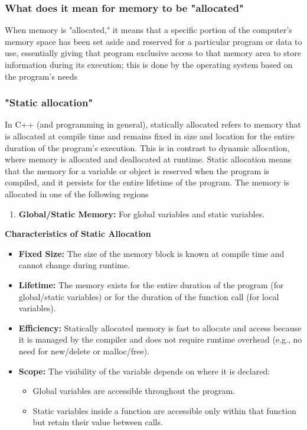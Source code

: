 \documentclass{report}
\begin{document}
 \bigbreak \noindent 
 \subsubsection{What does it mean for memory to be "allocated"}
 \bigbreak \noindent 
 When memory is "allocated," it means that a specific portion of the computer's memory space has been set aside and reserved for a particular program or data to use, essentially giving that program exclusive access to that memory area to store information during its execution; this is done by the operating system based on the program's needs

 \bigbreak \noindent 
 \subsubsection{"Static allocation"}
 \bigbreak \noindent 
 In C++ (and programming in general), statically allocated refers to memory that is allocated at compile time and remains fixed in size and location for the entire duration of the program's execution. This is in contrast to dynamic allocation, where memory is allocated and deallocated at runtime.
 \bigbreak \noindent 
 Static allocation means that the memory for a variable or object is reserved when the program is compiled, and it persists for the entire lifetime of the program.
 \bigbreak \noindent 
 The memory is allocated in one of the following regions
 \begin{enumerate}
     \item \textbf{Global/Static Memory:} For global variables and static variables.
 \end{enumerate}
 \bigbreak \noindent 
 \textbf{Characteristics of Static Allocation}
 \bigbreak \noindent 
 \begin{itemize}
     \item \textbf{Fixed Size:} The size of the memory block is known at compile time and cannot change during runtime.
     \item \textbf{Lifetime:} The memory exists for the entire duration of the program (for global/static variables) or for the duration of the function call (for local variables).
     \item \textbf{Efficiency:} Statically allocated memory is fast to allocate and access because it is managed by the compiler and does not require runtime overhead (e.g., no need for new/delete or malloc/free).
     \item \textbf{Scope:} The visibility of the variable depends on where it is declared:
         \begin{itemize}
             \item Global variables are accessible throughout the program.
             \item Static variables inside a function are accessible only within that function but retain their value between calls.
         \end{itemize}
 \end{itemize}
\end{document}
